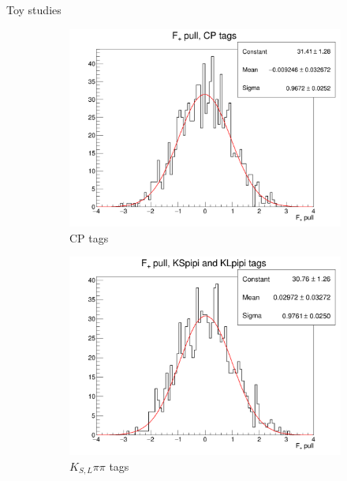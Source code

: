 \documentclass{beamer}
\begin{document}
\begin{frame}{Toy studies}
    \begin{figure}
    \centering
    \begin{subfigure}{0.33\textwidth}
      \centering
      \includegraphics[width=\textwidth]{Plots/FPlus_toy_CP.png}
      \caption{CP tags}
    \end{subfigure}%
    \begin{subfigure}{0.33\textwidth}
      \centering
      \includegraphics[width=\textwidth]{Plots/FPlus_toy_K0pipi.png}
      \caption{$K_{S, L}\pi\pi$ tags}
    \end{subfigure}
    \begin{subfigure}{0.33\textwidth}
      \centering

\end{subfigure}
\end{figure}
\end{frame}
\end{document}
